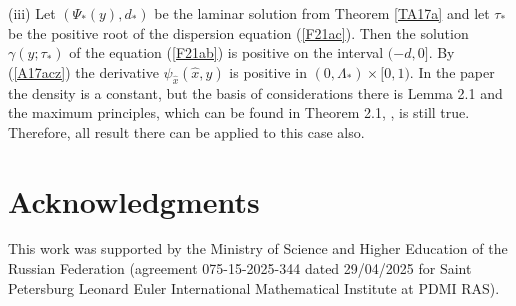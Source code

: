 \documentclass[a4paper,reqno,12pt]{amsart}
\theoremstyle{plain}
\theoremstyle{definition}
\numberwithin{equation}{section}
\begin{document}




(iii) Let  $(\Psi_*(y),d_*)$ be the laminar solution  from Theorem \ref{TA17a} and let $\tau_*$ be the positive root of the dispersion equation (\ref{F21ac}). Then the solution
$\gamma(y;\tau_*)$ of the equation (\ref{F21ab}) is positive on the interval $(-d,0]$. By (\ref{A17acz}) the derivative $\psi_{\hat{x}}(\hat{x},y)$
is positive in $(0,\Lambda_*)\times [0,1)$. In the paper \cite{Koz1Loop} the density is a constant, but the basis of considerations there is Lemma 2.1 and the maximum principles, which can be found in Theorem 2.1, \cite{AN}, is still true. Therefore, all result there can be applied to this case also.







\section*{Acknowledgments}

This work was supported by the Ministry of Science and Higher Education of
the Russian Federation (agreement 075-15-2025-344 dated 29/04/2025 for
Saint Petersburg Leonard Euler International Mathematical Institute at PDMI RAS).



\end{document}
